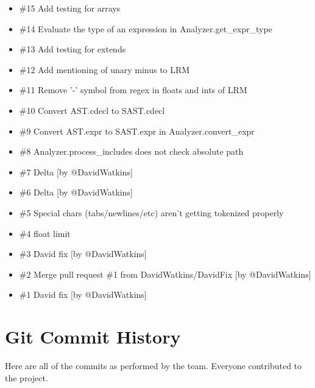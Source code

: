 \begin{homeworkProblem}
\begin{itemize}
		\item \#15 Add testing for arrays
		\item \#14 Evaluate the type of an expression in Analyzer.get\_expr\_type
		\item \#13 Add testing for extends
		\item \#12 Add mentioning of unary minus to LRM
		\item \#11 Remove '-' symbol from regex in floats and ints of LRM
		\item \#10 Convert AST.cdecl to SAST.cdecl
		\item \#9 Convert AST.expr to SAST.expr in Analyzer.convert\_expr
		\item \#8 Analyzer.process\_includes does not check absolute path
		\item \#7 Delta [by @DavidWatkins]
		\item \#6 Delta [by @DavidWatkins]
		\item \#5 Special chars (tabs/newlines/etc) aren't getting tokenized properly
		\item \#4 float limit
		\item \#3 David fix [by @DavidWatkins]
		\item \#2 Merge pull request \#1 from DavidWatkins/DavidFix [by @DavidWatkins]
		\item \#1 David fix [by @DavidWatkins]
	\end{itemize}
	\section{Git Commit History}
	Here are all of the commits as performed by the team. Everyone contributed to the project.
	

\end{homeworkProblem}
